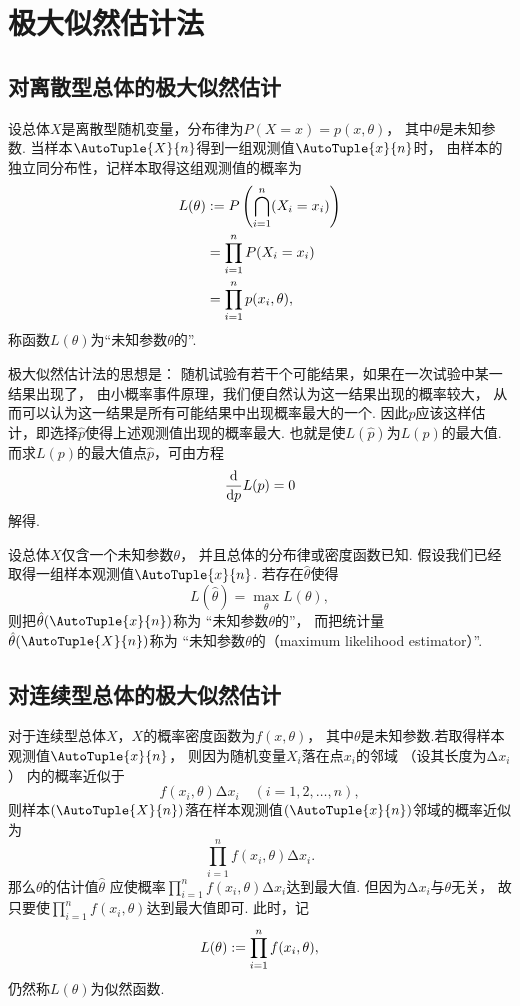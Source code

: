 \section{极大似然估计法}
\subsection{对离散型总体的极大似然估计}
设总体\(X\)是离散型随机变量，分布律为\(P(X=x)=p(x,\theta)\)，
其中\(\theta\)是未知参数.
当样本\(\AutoTuple{X}{n}\)得到一组观测值\(\AutoTuple{x}{n}\)时，
由样本的独立同分布性，记样本取得这组观测值的概率为
\begin{align*}
	L(\theta)
	&:= P\left(\bigcap_{i=1}^n(X_i=x_i)\right) \\
	&= \prod_{i=1}^n P(X_i=x_i) \\
	&= \prod_{i=1}^n p(x_i,\theta),
\end{align*}
称函数\(L(\theta)\)为“未知参数\(\theta\)的”.

极大似然估计法的思想是：
随机试验有若干个可能结果，如果在一次试验中某一结果出现了，
由小概率事件原理，我们便自然认为这一结果出现的概率较大，
从而可以认为这一结果是所有可能结果中出现概率最大的一个.
因此\(p\)应该这样估计，即选择\(\hat{p}\)使得上述观测值出现的概率最大.
也就是使\(L(\hat{p})\)为\(L(p)\)的最大值.
而求\(L(p)\)的最大值点\(\hat{p}\)，可由方程\[
	\dv{p} L(p) = 0
\]解得.

\begin{definition}
设总体\(X\)仅含一个未知参数\(\theta\)，
并且总体的分布律或密度函数已知.
假设我们已经取得一组样本观测值\(\AutoTuple{x}{n}\).
若存在\(\hat{\theta}\)使得\[
	L(\hat{\theta}) = \max_\theta L(\theta),
\]
则把\(\hat{\theta}(\AutoTuple{x}{n})\)称为
“未知参数\(\theta\)的”，
而把统计量\(\hat{\theta}(\AutoTuple{X}{n})\)称为
“未知参数\(\theta\)的（maximum likelihood estimator）”.
\end{definition}

\subsection{对连续型总体的极大似然估计}
对于连续型总体\(X\)，\(X\)的概率密度函数为\(f(x,\theta)\)，
其中\(\theta\)是未知参数.若取得样本观测值\(\AutoTuple{x}{n}\)，
则因为随机变量\(X_i\)落在点\(x_i\)的邻域
（设其长度为\(\increment x_i\)）
内的概率近似于\[
	f(x_i,\theta) \increment x_i
	\quad(i=1,2,\dotsc,n),
\]
则样本\((\AutoTuple{X}{n})\)落在样本观测值\((\AutoTuple{x}{n})\)邻域的概率近似为\[
	\prod_{i=1}^n f(x_i,\theta) \increment x_i.
\]
那么\(\theta\)的估计值\(\hat{\theta}\)
应使概率\(\prod_{i=1}^n f(x_i,\theta) \increment x_i\)达到最大值.
但因为\(\increment x_i\)与\(\theta\)无关，
故只要使\(\prod_{i=1}^n{f(x_i,\theta)}\)达到最大值即可.
此时，记\[
	L(\theta) := \prod_{i=1}^n{f(x_i,\theta)},
\]
仍然称\(L(\theta)\)为似然函数.

